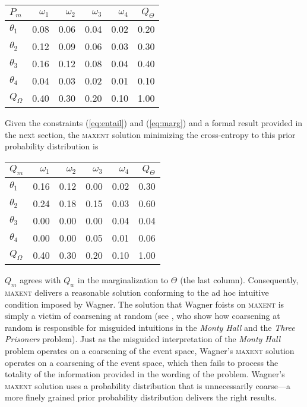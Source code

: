 \documentclass[11pt]{article}
\begin{document}
\begin{tabular}{|l|r|r|r|r|r|}\hline
  $P_{m}$ & $\omega_{1}$ & $\omega_{2}$ & $\omega_{3}$ & $\omega_{4}$ & $Q_{\Theta}$ \\ \hline
$\theta_{1}$ & 0.08 & 0.06 & 0.04 & 0.02 & 0.20 \\ \hline
$\theta_{2}$ & 0.12 & 0.09 & 0.06 & 0.03 & 0.30 \\ \hline
$\theta_{3}$ & 0.16 & 0.12 & 0.08 & 0.04 & 0.40 \\ \hline
$\theta_{4}$ & 0.04 & 0.03 & 0.02 & 0.01 & 0.10 \\ \hline
$Q_{\Omega}$ & 0.40 & 0.30 & 0.20 & 0.10 & 1.00\\ \hline
\end{tabular}

\medskip

Given the constraints (\ref{eq:entail}) and (\ref{eq:marg}) and a
formal result provided in the next section, the \textsc{maxent}
solution minimizing the cross-entropy to this prior probability
distribution is

\medskip

\begin{tabular}{|l|r|r|r|r|r|}\hline
  $Q_{m}$ & $\omega_{1}$ & $\omega_{2}$ & $\omega_{3}$ & $\omega_{4}$ & $Q_{\Theta}$ \\ \hline
$\theta_{1}$ & 0.16 & 0.12 & 0.00 & 0.02 & 0.30 \\ \hline
$\theta_{2}$ & 0.24 & 0.18 & 0.15 & 0.03 & 0.60 \\ \hline
$\theta_{3}$ & 0.00 & 0.00 & 0.00 & 0.04 & 0.04 \\ \hline
$\theta_{4}$ & 0.00 & 0.00 & 0.05 & 0.01 & 0.06 \\ \hline
$Q_{\Omega}$ & 0.40 & 0.30 & 0.20 & 0.10 & 1.00\\ \hline
\end{tabular}

\medskip

$Q_{m}$ agrees with $Q_{w}$ in the marginalization to $\Theta$ (the
last column). Consequently, \textsc{maxent} delivers a reasonable
solution conforming to the ad hoc intuitive condition imposed by
Wagner. The solution that Wagner foists on \textsc{maxent} is simply a
victim of coarsening at random (see ,
who show how coarsening at random is responsible for misguided
intuitions in the \emph{Monty Hall} and the \emph{Three Prisoners}
problem). Just as the misguided interpretation of the \emph{Monty
  Hall} problem operates on a coarsening of the event space, Wagner's
\textsc{maxent} solution operates on a coarsening of the event space,
which then fails to process the totality of the information provided
in the wording of the problem. Wagner's \textsc{maxent} solution uses
a probability distribution that is unnecessarily coarse---a more
finely grained prior probability distribution delivers the right
results.
\end{document}
